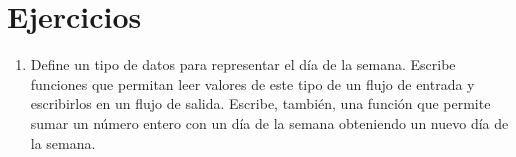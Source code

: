 \section{Ejercicios}

\begin{enumerate}

\item Define un tipo de datos para representar el día de la semana.
      Escribe funciones que permitan leer valores de este tipo de un flujo
      de entrada y escribirlos en un flujo de salida.
      Escribe, también, una función que permite sumar un número entero
      con un día de la semana obteniendo un nuevo día de la semana.

\end{enumerate}
